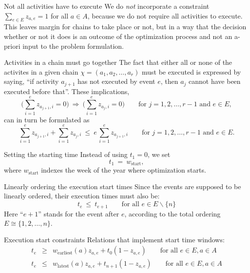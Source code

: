 \documentclass[11pt,reqno]{amsart}
\numberwithin{equation}{section}
\begin{document}
\begin{mydesc}

\item[Not all activities have to execute] We do \emph{not} incorporate a constraint
  $\sum_{e\in E} z_{a,e}=1$ for all $a\in A$, because we do not require all activities to
  execute. This leaves margin for chains to take place or not, but in a way that the
  decision whether or not it does is an outcome of the optimization process and not an
  a-priori input to the problem formulation.

\item[Activities in a chain must go together] The fact that either all or none of the
  activites in a given chain $\chi=(a_1,a_2,\dots,a_r)$ must be executed is expressed by saying, ``if activity $a_{j+1}$ has not executed by event $e$, then $a_j$ cannot have been executed before that''. These implications, 
  \[
     \Big(\sum_{i=1}^e z_{a_{j+1},i}=0\Big)
      \ \Longrightarrow \
      \Big(\sum_{i=1}^e z_{a_j,i}=0\Big)
     \qquad\text{for } j=1,2,\dots,r-1
     \text{ and } e\in E,
  \]
  can in turn be formulated as
  \begin{equation}
    \sum_{i=1}^e z_{a_{j+1},i} + \sum_{i=1}^e z_{a_j, i} 
    \ \le \
    e\, \sum_{i=1}^e z_{a_{j+1}, i}
    \qquad\text{for } j=1,2,\dots, r-1
     \text{ and } e\in E.
  \end{equation}

\item[Setting the starting time] Instead of using $t_1=0$, we set
  \begin{equation}
     t_1
     \ = \
     w_{\text{start}},
  \end{equation}
  where $w_{\text{start}}$ indexes the week of the year where optimization starts. 

\item[Linearly ordering the execution start times] Since the events are supposed to be linearly
  ordered,  their execution times must also be:
  \begin{equation}
     t_e 
     \ \le \
     t_{e+1}
     \qquad\text{for all }
      e\in E\smallsetminus\{n\}
  \end{equation}
  Here ``$e+1$'' stands for the event after $e$, according to the total ordering
  $E\cong\{1,2,\dots,n\}$.

\item[Execution start constraints] Relations that implement start time windows:
  \begin{eqnarray}
    t_e 
    & \ge &
    w_{\text{earliest}}(a) z_{a,e} + t_0 (1-z_{a,e})
    \qquad\text{for all } e\in E, a\in A
    \\
    t_e 
    & \le &
    w_{\text{latest}}(a) z_{a,e} + t_{n+1}(1-z_{a,e})
    \qquad\text{for all } e\in E, a\in A
  \end{eqnarray}
  


\end{mydesc}
\end{document}

